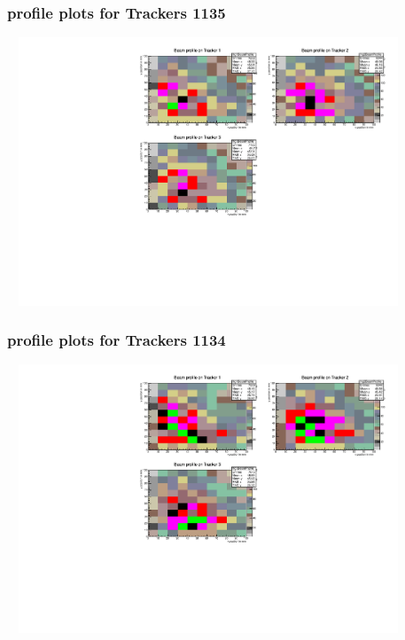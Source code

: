 \documentclass[slidestop,compress,mathserif]{beamer}
\begin{document}
\begin{frame}\frametitle{profile plots for Trackers 1135}
	 \includegraphics[width=12cm,height=8cm]{profile_plots_for_Trackers_1135.pdf}
\end{frame}
\begin{frame}\frametitle{profile plots for Trackers 1134}
	 \includegraphics[width=12cm,height=8cm]{profile_plots_for_Trackers_1134.pdf}
\end{frame}
\end{document}
